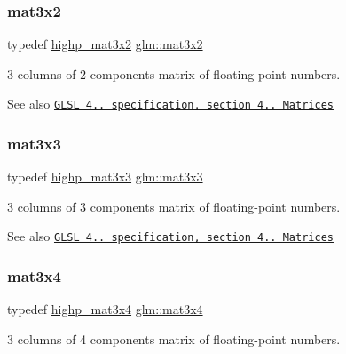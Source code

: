\subsubsection{\texorpdfstring{mat3x2}{mat3x2}}
{\footnotesize\ttfamily typedef \hyperlink{group__core__precision_ga5df0f5c4120d0fd47825506c86b7814c}{highp\+\_\+mat3x2} \hyperlink{group__core__types_gad7476e0e866186f12ee87975c6b01552}{glm\+::mat3x2}}

3 columns of 2 components matrix of floating-\/point numbers.

\begin{DoxySeeAlso}{See also}
\href{http://www.opengl.org/registry/doc/GLSLangSpec.4.20.8.pdf}{\tt G\+L\+SL 4.. specification, section 4.. Matrices} 
\end{DoxySeeAlso}
\mbox{\label{group__core__types_ga6fecca6a869070b6bf8acb44ce1c2af3}} 
\subsubsection{\texorpdfstring{mat3x3}{mat3x3}}
{\footnotesize\ttfamily typedef \hyperlink{group__core__precision_gac4db2c4ff089b960ddd5682abaa9e5d4}{highp\+\_\+mat3x3} \hyperlink{group__core__types_ga6fecca6a869070b6bf8acb44ce1c2af3}{glm\+::mat3x3}}

3 columns of 3 components matrix of floating-\/point numbers.

\begin{DoxySeeAlso}{See also}
\href{http://www.opengl.org/registry/doc/GLSLangSpec.4.20.8.pdf}{\tt G\+L\+SL 4.. specification, section 4.. Matrices} 
\end{DoxySeeAlso}
\mbox{\label{group__core__types_ga5524ae15d7fc00a68b8e0e3a0733cc2a}} 
\subsubsection{\texorpdfstring{mat3x4}{mat3x4}}
{\footnotesize\ttfamily typedef \hyperlink{group__core__precision_gab51b3b8377cf9462a39a1560333a4215}{highp\+\_\+mat3x4} \hyperlink{group__core__types_ga5524ae15d7fc00a68b8e0e3a0733cc2a}{glm\+::mat3x4}}

3 columns of 4 components matrix of floating-\/point numbers.


